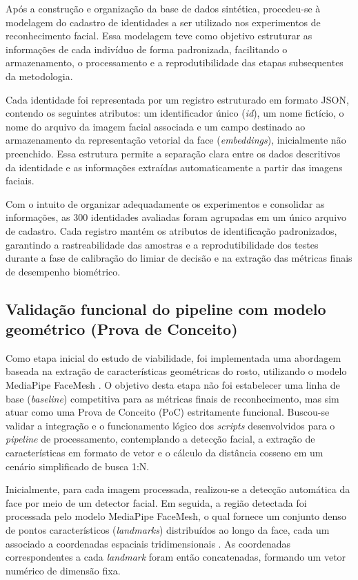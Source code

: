 Após a construção e organização da base de dados sintética, procedeu-se à modelagem do cadastro de identidades a ser utilizado nos experimentos de reconhecimento facial. Essa modelagem teve como objetivo estruturar as informações de cada indivíduo de forma padronizada, facilitando o armazenamento, o processamento e a reprodutibilidade das etapas subsequentes da metodologia.

Cada identidade foi representada por um registro estruturado em formato \acs{JSON}, contendo os seguintes atributos: um identificador único (\textit{id}), um nome fictício, o nome do arquivo da imagem facial associada e um campo destinado ao armazenamento da representação vetorial da face (\textit{embeddings}), inicialmente não preenchido. Essa estrutura permite a separação clara entre os dados descritivos da identidade e as informações extraídas automaticamente a partir das imagens faciais.

Com o intuito de organizar adequadamente os experimentos e consolidar as informações, as 300 identidades avaliadas foram agrupadas em um único arquivo de cadastro. Cada registro mantém os atributos de identificação padronizados, garantindo a rastreabilidade das amostras e a reprodutibilidade dos testes durante a fase de calibração do limiar de decisão e na extração das métricas finais de desempenho biométrico.


\subsection{Validação funcional do pipeline com modelo geométrico (Prova de Conceito)}

Como etapa inicial do estudo de viabilidade, foi implementada uma abordagem baseada na extração de características geométricas do rosto, utilizando o modelo MediaPipe FaceMesh \cite{mlkit_face_mesh}. O objetivo desta etapa não foi estabelecer uma linha de base (\textit{baseline}) competitiva para as métricas finais de reconhecimento, mas sim atuar como uma Prova de Conceito (\acs{PoC}) estritamente funcional. Buscou-se validar a integração e o funcionamento lógico dos \textit{scripts} desenvolvidos para o \textit{pipeline} de processamento, contemplando a detecção facial, a extração de características em formato de vetor e o cálculo da distância cosseno em um cenário simplificado de busca 1:N.

Inicialmente, para cada imagem processada, realizou-se a detecção automática da face por meio de um detector facial. Em seguida, a região detectada foi processada pelo modelo MediaPipe FaceMesh, o qual fornece um conjunto denso de pontos característicos (\textit{landmarks}) distribuídos ao longo da face, cada um associado a coordenadas espaciais tridimensionais \cite{mlkit_face_mesh}. As coordenadas correspondentes a cada \textit{landmark} foram então concatenadas, formando um vetor numérico de dimensão fixa.

